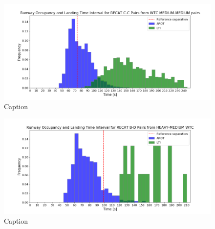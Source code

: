 \begin{figure}[h]
    \centering
    \includegraphics[width=1\textwidth]{graphics/fig_CC_from_MM_pairs_time_sep.png}
    \caption[list of figures caption]{Caption}
    \label{fig:CC_from_MM_pairs_time_sep}
\end{figure}

\begin{figure}[h]
    \centering
    \includegraphics[width=1\textwidth]{graphics/fig_BD_from_HM_pairs_time_sep.png}
    \caption[list of figures caption]{Caption}
    \label{fig:BD_from_HM_pairs_time_sep}
\end{figure}








